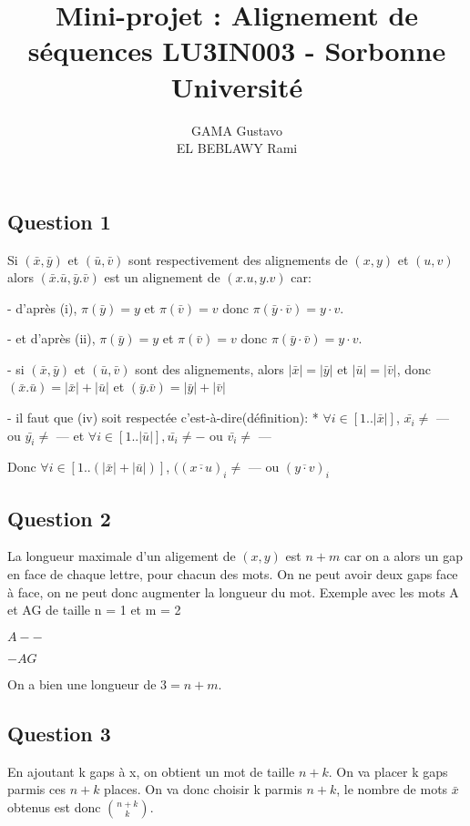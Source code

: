 \documentclass{report}
\title{Mini-projet : Alignement de séquences LU3IN003 - Sorbonne Université}
\author{GAMA Gustavo \\ EL BEBLAWY Rami}
\date{}
\begin{document}
\maketitle


\subsection*{Question 1}
Si $(\bar{x},\bar{y})$ et $(\bar{u},\bar{v})$ sont respectivement des alignements de $(x,y)$ et $(u,v)$ alors $(\bar{x}.\bar{u},\bar{y}.\bar{v})$ est un alignement de $(x.u, y.v)$ car:

- d'après (i), $\pi(\bar{y})=y$ et $\pi(\bar{v})=v$ donc $\pi(\bar{y}\cdot \overline{v}) = y\cdot v$.

- et d'après (ii), $\pi(\bar{y})= y$ et $\pi(\bar{v}) = v$ donc $\pi(\bar{y}\cdot \bar{v}) = y\cdot v$.

- si $(\bar{x},\bar{y})$ et $(\bar{u},\bar{v})$ sont des alignements, alors $|\bar{x}|=|\bar{y}|$ et $|\bar{u}|=|\bar{v}|$, donc $(\bar{x}.\bar{u}) = |\bar{x}|+|\bar{u}|$ et $(\bar{y}.\bar{v}) = |\bar{y}|+|\bar{v}|$

- il faut que (iv) soit respectée c'est-à-dire(définition): * $\forall i \in [1..|\bar{x}|]$, $\bar{x_{i}}\ne$ --- ou $\bar{y_{i}}\ne$ --- et $\forall i \in [1..|\bar{u}|], \bar{u_{i}}\ne -$ ou $\bar{v_{i}}\ne$ ---

Donc $\forall i\in [1..(|\bar{x}|+|\bar{u}|)]$, $((\overline{x\cdot u})_{i} \ne$ --- ou $(\overline{y\cdot v})_{i}$

\subsection*{Question 2}
La longueur maximale d'un aligement de $(x,y)$ est $n+m$ car on a alors un gap en face de chaque lettre, pour chacun des mots. On ne peut avoir deux gaps face à face, on ne peut donc augmenter la longueur du mot. Exemple avec les mots A et AG de taille n = 1 et m = 2
\begin{center}
$A--$

$-AG$
\end{center}
On a bien une longueur de $3 = n + m $.

\subsection*{Question 3}
En ajoutant k gaps à x, on obtient un mot de taille $n+k$. On va placer k gaps parmis ces $n+k$ places. On va donc choisir k parmis $n+k$, le nombre de mots $\bar{x}$ obtenus est donc $\binom{n+k}{k}$.
\end{document}
